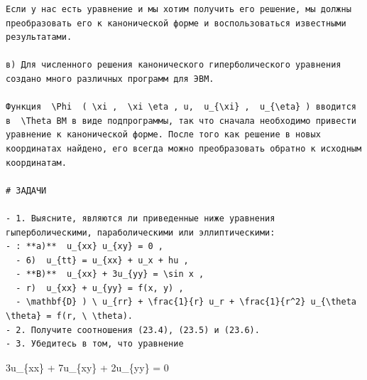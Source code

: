 \documentclass[
  ukrainian,
]{article}
\begin{document}
\begin{verbatim}
Если у нас есть уравнение и мы хотим получить его решение, мы должны преобразовать его к канонической форме и воспользоваться известными результатами.

в) Для численного решения канонического гиперболического уравнения создано много различных программ для ЭВМ.

Функция  \Phi  ( \xi ,  \xi \eta , u,  u_{\xi} ,  u_{\eta} ) вводится в  \Theta ВМ в виде подпрограммы, так что сначала необходимо привести уравнение к канонической форме. После того как решение в новых координатах найдено, его всегда можно преобразовать обратно к исходным координатам.

# ЗАДАЧИ

- 1. Выясните, являются ли приведенные ниже уравнения гыперболическими, параболическими или эллиптическими:
- : **a)**  u_{xx} u_{xy} = 0 ,
  - 6)  u_{tt} = u_{xx} + u_x + hu ,
  - **B)**  u_{xx} + 3u_{yy} = \sin x ,
  - r)  u_{xx} + u_{yy} = f(x, y) ,
  - \mathbf{D} ) \ u_{rr} + \frac{1}{r} u_r + \frac{1}{r^2} u_{\theta \theta} = f(r, \ \theta).
- 2. Получите соотношения (23.4), (23.5) и (23.6).
- 3. Убедитесь в том, что уравнение
\end{verbatim}

3u\_\{xx\} + 7u\_\{xy\} + 2u\_\{yy\} = 0
\end{document}
